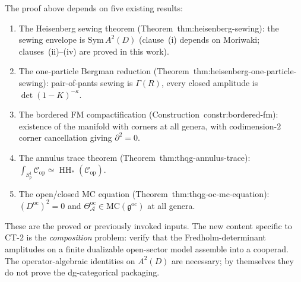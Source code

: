 \documentclass[11pt]{article}
\newcommand{\cA}{\mathcal{A}}
\newcommand{\cC}{\mathcal{C}}
\newcommand{\MC}{\mathrm{MC}}
\newcommand{\HH}{\operatorname{HH}}
\begin{document}
\begin{remark}
\label{rem:ct2-heisenberg-dependencies}
The proof above depends on five existing results:
\begin{enumerate}[label=\textup{(\arabic*)},nosep]
\item The Heisenberg sewing theorem
  (Theorem~\textup{thm:heisenberg-sewing}):
  the sewing envelope is $\mathrm{Sym}\, A^2(D)$
  (clause~(i) depends on Moriwaki; clauses~(ii)--(iv)
  are proved in this work).
\item The one-particle Bergman reduction
  (Theorem~\textup{thm:heisenberg-one-particle-sewing}):
  pair-of-pants sewing is $\Gamma(R)$, every closed amplitude
  is $\det(1-K)^{-\kappa}$.
\item The bordered FM compactification
  (Construction~\textup{constr:bordered-fm}): existence of the
  manifold with corners at all genera, with codimension-$2$
  corner cancellation giving $\partial^2 = 0$.
\item The annulus trace theorem
  (Theorem~\textup{thm:thqg-annulus-trace}):
  $\int_{S^1_p} \cC_{\mathrm{op}} \simeq
  \HH_*(\cC_{\mathrm{op}})$.
\item The open/closed MC equation
  (Theorem~\textup{thm:thqg-oc-mc-equation}):
  $(D^{\mathrm{oc}})^2 = 0$ and
  $\Theta^{\mathrm{oc}}_\cA \in \MC(\mathfrak{g}^{\mathrm{oc}})$
  at all genera.
\end{enumerate}
These are the proved or previously invoked inputs.  The new
content specific to CT-$2$ is the \emph{composition} problem:
verify that the Fredholm-determinant amplitudes on a finite
dualizable open-sector model assemble into a cooperad.  The
operator-algebraic identities on $A^2(D)$ are necessary; by
themselves they do not prove the dg-categorical packaging.
\end{remark}
\end{document}
